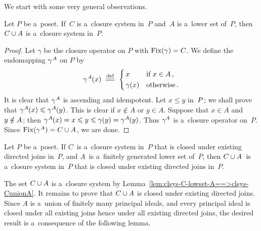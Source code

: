 \documentclass[11pt,letterpaper]{article}
\renewcommand{\thmskip}{\bigskip}
\renewcommand{\interskip}{\medskip}
\begin{document}
\thmskip

We start with some very general observations.

\thmskip

\begin{lemma}\label{lem:clsys-C-lowset-A==>clsys-CunionA}
Let\/ $P$ be a~poset.
If\/~$C$ is a~closure system in\/~$P$ and\/~$A$ is a~lower set of\/~$P$,
then\/~$C\cup A$ is a~closure system in\/~$P$.
\end{lemma}

\interskip

\begin{proof}
Let $\gamma$ be the closure operator on $P$ with $\mathop{\smash{\mathrm{Fix}}}\nolimits(\gamma)=C$.
We define the endomapping $\gamma^{\mspace{1mu} A}$ on $P$ by
%
\begin{equation*}
\gamma^{\mspace{1mu} A\mspace{-1mu}}(x) \:\mathrel{\overset{\text{def}}{\mspace{1mu}=\!=\mspace{1mu}}}\:
	\begin{cases}
	\,x & \text{if $x\in A$}\,, \\[.25ex]
	\,\gamma(x) & \text{otherwise}\,.
	\end{cases}
\end{equation*}
%
It is clear that $\gamma^{\mspace{1mu} A}$ is ascending and idempotent.
Let $x\leq y$ in~$P\mspace{1mu}$;
	we shall prove that $\gamma^{\mspace{1mu} A\mspace{-1mu}}(x) \leqslant \gamma^{\mspace{1mu} A\mspace{-1mu}}(y)\mspace{1mu}$.
This is clear if $x\notin A$ or $y\in A$.
Suppose that $x\in A$ and $y\notin A\mspace{1mu}$;
then $\gamma^{\mspace{1mu} A\mspace{-1mu}}(x) = x \leqslant y \leqslant \gamma(y) = \gamma^{\mspace{1mu} A\mspace{-1mu}}(y)\mspace{1mu}$.
Thus $\gamma^{\mspace{-1mu} A\mspace{1mu}}$ is a~closure operator on~$P$.
Since $\mathop{\smash{\mathrm{Fix}}}\nolimits(\gamma^{\mspace{1mu} A}) = C\cup A\mspace{1mu}$, we are done.
\end{proof}

\thmskip

\begin{lemma}\label{lem:clsys-dirclsd-C-fingen-lowset-A=>clsys-dirclsd-CunionA}
Let\/ $P$ be a~poset.
If\/ $C$~is a~closure system in\/~$P$
	that is closed under existing directed joins in\/~$P$,
and\/ $A$~is a~finitely generated lower set of\/~$P$,
then\/ $C\cup A$~is a~closure system in\/~$P$
	that is closed under existing directed joins in\/~$P$.
\end{lemma}

\thmskip

The set $C\cup A$ is a~closure system
	by Lemma~\ref{lem:clsys-C-lowset-A==>clsys-CunionA}.
It remains to prove that $C\cup A$ is closed under existing directed joins.
Since $A$ is a~union of finitely many principal ideals,
and every principal ideal is closed under all existing joins
	hence under all existing directed joins,
the desired result is a~consequence of the following lemma.
\end{document}
